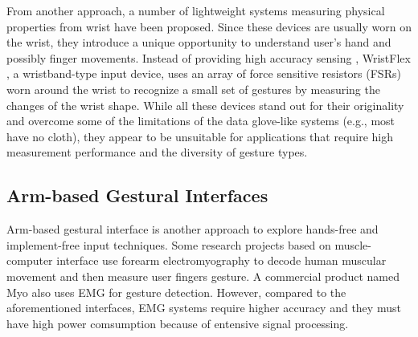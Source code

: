 \documentclass{sigchi}
\begin{document}

From another approach, a number of lightweight systems measuring physical properties from wrist have been proposed. Since these devices are usually worn on the wrist, they introduce a unique opportunity to understand user's hand and possibly finger movements. Instead of providing high accuracy sensing , WristFlex \cite{Dementyev:2014:WLG:2642918.2647396}, a wristband-type input device, uses an array of force sensitive resistors (FSRs) worn around the wrist to recognize a small set of gestures by measuring the changes of the wrist shape. While all these devices stand out for their originality and overcome some of the limitations of the data glove-like systems (e.g., most have no cloth), they appear to be unsuitable for applications that require high measurement performance and the diversity of gesture types.


\subsection{Arm-based Gestural Interfaces}

Arm-based gestural interface is another approach to explore hands-free and implement-free input techniques. Some research projects based on muscle-computer interface \cite{Saponas:2009:EAI:1622176.1622208} use forearm electromyography to decode human muscular movement and then measure user fingers gesture. A commercial product named Myo also uses EMG for gesture detection. However, compared to the aforementioned interfaces, EMG systems require higher accuracy and they must have high power comsumption because of entensive signal processing.  

\end{document}
